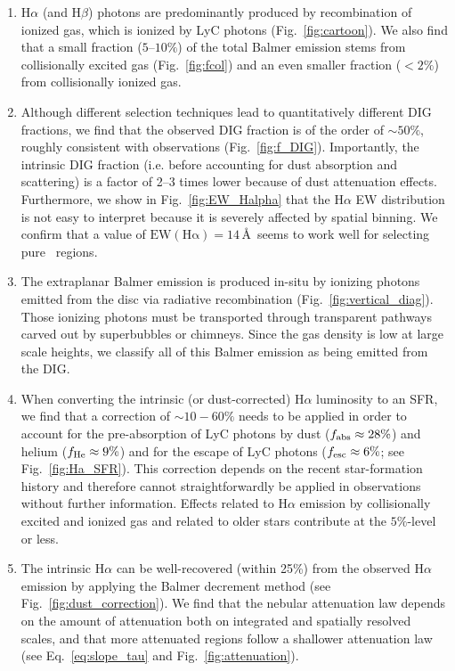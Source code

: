 \documentclass[fleqn,usenatbib]{mnras}
\newcommand\HII{\ion{H}{II}~} %
\begin{document}
\begin{enumerate}
    \item H$\alpha$ (and H$\beta$) photons are predominantly produced by recombination of ionized gas, which is ionized by LyC photons (Fig.~\ref{fig:cartoon}). We also find that a small fraction ($5$--$10\%$) of the total Balmer emission stems from collisionally excited gas (Fig.~\ref{fig:fcol}) and an even smaller fraction ($<2\%$) from collisionally ionized gas.
    \item Although different selection techniques lead to quantitatively different DIG fractions, we find that the observed DIG fraction is of the order of $\sim50\%$, roughly consistent with observations (Fig.~\ref{fig:f_DIG}). Importantly, the intrinsic DIG fraction (i.e. before accounting for dust absorption and scattering) is a factor of 2--3 times lower because of dust attenuation effects. Furthermore, we show in Fig.~\ref{fig:EW_Halpha} that the H$\alpha$ EW distribution is not easy to interpret because it is severely affected by spatial binning. We confirm that a value of $\mathrm{EW(H\alpha)}=14$\,\AA\ seems to work well for selecting pure \HII regions.
    \item The extraplanar Balmer emission is produced in-situ by ionizing photons emitted from the disc via radiative recombination (Fig.~\ref{fig:vertical_diag}). Those ionizing photons must be transported through transparent pathways carved out by superbubbles or chimneys. Since the gas density is low at large scale heights, we classify all of this Balmer emission as being emitted from the DIG.
    \item When converting the intrinsic (or dust-corrected) H$\alpha$ luminosity to an SFR, we find that a correction of $\sim10-60\%$ needs to be applied in order to account for the pre-absorption of LyC photons by dust ($f_{\rm abs}\approx28\%$) and helium ($f_{\rm He}\approx9\%$) and for the escape of LyC photons ($f_{\rm esc}\approx6\%$; see Fig.~\ref{fig:Ha_SFR}). This correction depends on the recent star-formation history and therefore cannot straightforwardly be applied in observations without further information. Effects related to H$\alpha$ emission by collisionally excited and ionized gas and related to older stars contribute at the $5\%$-level or less.
    \item The intrinsic H$\alpha$ can be well-recovered (within 25\%) from the observed H$\alpha$ emission by applying the Balmer decrement method (see Fig.~\ref{fig:dust_correction}). We find that the nebular attenuation law depends on the amount of attenuation both on integrated and spatially resolved scales, and that more attenuated regions follow a shallower attenuation law (see Eq.~\ref{eq:slope_tau} and Fig.~\ref{fig:attenuation}).

\end{enumerate}
\end{document}
